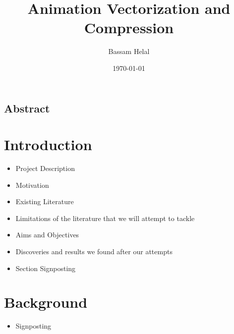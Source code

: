 \documentclass[12pt]{article}
\title{Animation Vectorization and Compression}
\author{Bassam Helal}
\date{ \today }
\begin{document}
    \pagecolor{black}
    \color{white}

    \maketitle

    \pagebreak

    \begin{center}
        \section*{Abstract}
    \end{center}

    \pagebreak

    \renewcommand*\contentsname{
    \begin{center}
        Table of Contents
    \end{center}}

    \tableofcontents

    \pagebreak


    \section{Introduction}

    \begin{itemize}
        \item Project Description
        \item Motivation
        \item Existing Literature
        \item Limitations of the literature that we will attempt to tackle
        \item Aims and Objectives
        \item Discoveries and results we found after our attempts
        \item Section Signposting
    \end{itemize}

    \pagebreak


    \section{Background}


    \begin{itemize}
        \item Signposting
    \end{itemize}
\end{document}
